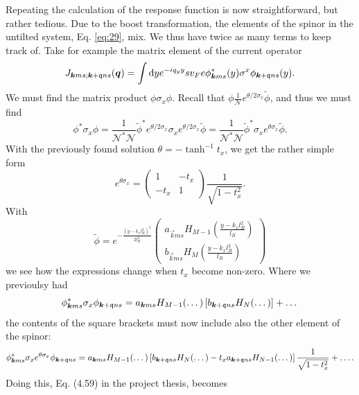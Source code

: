 Repeating the calculation of the response function is now straightforward, but rather tedious.
Due to the boost transformation, the elements of the spinor in the untilted system, Eq. \eqref{eq:29}, mix.
We thus have twice as many terms to keep track of.
Take for example the matrix element of the current operator
\[
  J_{\bm{k} m s; \bm{k}+\mathfrak{q} n s } (\bm{q}) = \int \mathrm{d}y e^{-i q_{y} y}
  s v_{F} e \phi ^{*}_{\bm{k} m s} (y) \sigma ^{x} \phi _{\bm{k} + \mathfrak{q} n s}(y).
\]
We must find the matrix product \(\phi \sigma_{x} \phi \).
Recall that \(\phi \frac{1}{\mathcal{N}} e^{\theta /2 \sigma _{x}} \tilde{\phi} \), and thus we must find
\[
  \phi ^{*} \sigma _{x} \phi = \frac{1}{\mathcal{N}^{*} \mathcal{N}} \tilde{\phi}^{*} e^{\theta /2 \sigma _{x}} \sigma _{x} e^{\theta /2 \sigma _{x}} \tilde{\phi} =  \frac{1}{\mathcal{N}^{*} \mathcal{N}} \tilde{\phi}^{*} \sigma _{x} e^{\theta \sigma _{x}} \tilde{\phi}.
\]
With the previously found solution \(\theta = - \tanh ^{-1} t_{x}\), we get the rather simple form
\[
  e^{\theta \sigma _{x}} =
  \begin{pmatrix}
    1 & -t_{x}\\
    -t_{x} & 1
  \end{pmatrix}
  \frac{1}{\sqrt{1-t_{x}^2}}.
\]
With
\[
  \tilde{\phi} = e^{-\frac{(y - k_{x} l_{B}^2)^2}{2 l_{B}^2}}
  \begin{pmatrix}
    a_{\vec{k} m s} H_{M-1} (\frac{y-k_{x} l_{B}^2}{l_{B}})\\
    b_{\vec{k} m s} H_{M} (\frac{y-k_{x} l_{B}^2}{l_{B}})
  \end{pmatrix}
\]
we see how the expressions change when \(t_{x}\) become non-zero.
Where we previoulsy had
\begin{equation}
  \label{eq:27}
  \phi ^{*}_{\bm{k} m s} \sigma _{x} \phi _{\bm{k} + \mathfrak{q} n s}
  =
  a_{\bm{k} m s} H_{M-1}(\dots) \left[ b_{\bm{k}+\mathfrak{q} n s} H_{N}(\dots) \right]
  + \dots
\end{equation}
the contents of the square brackets must now include also the other element of the spinor:
\begin{equation}
  \label{eq:28}
  \phi ^{*}_{\bm{k} m s} \sigma _{x} e^{\theta \sigma _{x}} \phi _{\bm{k} + \mathfrak{q} n s}
  =
  a_{\bm{k} m s} H_{M-1}(\dots)
  \left[
    b_{\bm{k}+\mathfrak{q} n s} H_{N}(\dots)
    - t_{x} a_{\bm{k} + \mathfrak{q} n s} H_{N-1} (\dots)
  \right]
  \frac{1}{\sqrt{1-t_{x}^2}}
  + \dots .
\end{equation}
Doing this, Eq. (4.59)  in the project thesis, becomes
